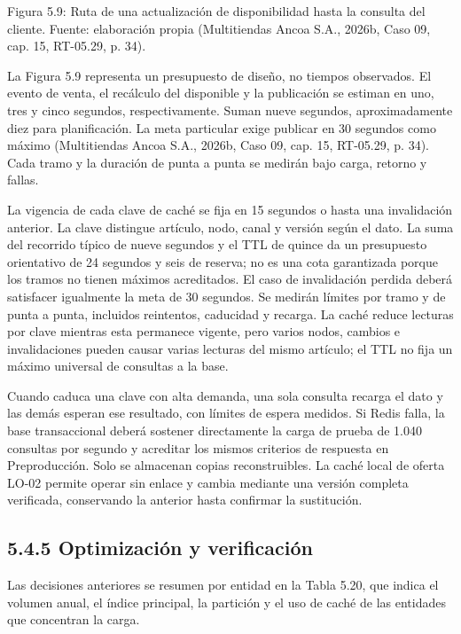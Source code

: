 \documentclass[11pt]{article}
\begin{document}
Figura 5.9: Ruta de una actualización de disponibilidad hasta la consulta del cliente. Fuente: elaboración propia (Multitiendas Ancoa S.A., 2026b, Caso 09, cap. 15, RT-05.29, p. 34).


La Figura 5.9 representa un presupuesto de diseño, no tiempos observados. El evento de venta, el recálculo del disponible y la publicación se estiman en uno, tres y cinco segundos, respectivamente. Suman nueve segundos, aproximadamente diez para planificación. La meta particular exige publicar en 30 segundos como máximo (Multitiendas Ancoa S.A., 2026b, Caso 09, cap. 15, RT-05.29, p. 34). Cada tramo y la duración de punta a punta se medirán bajo carga, retorno y fallas.

La vigencia de cada clave de caché se fija en 15 segundos o hasta una invalidación anterior. La clave distingue artículo, nodo, canal y versión según el dato. La suma del recorrido típico de nueve segundos y el TTL de quince da un presupuesto orientativo de 24 segundos y seis de reserva; no es una cota garantizada porque los tramos no tienen máximos acreditados. El caso de invalidación perdida deberá satisfacer igualmente la meta de 30 segundos. Se medirán límites por tramo y de punta a punta, incluidos reintentos, caducidad y recarga. La caché reduce lecturas por clave mientras esta permanece vigente, pero varios nodos, cambios e invalidaciones pueden causar varias lecturas del mismo artículo; el TTL no fija un máximo universal de consultas a la base.

Cuando caduca una clave con alta demanda, una sola consulta recarga el dato y las demás esperan ese resultado, con límites de espera medidos. Si Redis falla, la base transaccional deberá sostener directamente la carga de prueba de 1.040 consultas por segundo y acreditar los mismos criterios de respuesta en Preproducción. Solo se almacenan copias reconstruibles. La caché local de oferta LO-02 permite operar sin enlace y cambia mediante una versión completa verificada, conservando la anterior hasta confirmar la sustitución.

\subsection{5.4.5 Optimización y verificación}

Las decisiones anteriores se resumen por entidad en la Tabla 5.20, que indica el volumen anual, el índice principal, la partición y el uso de caché de las entidades que concentran la carga.
\end{document}
